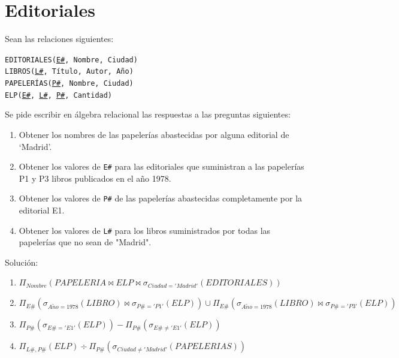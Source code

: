 \documentclass[a4paper]{article}
\begin{document}
\section{Editoriales}

Sean las relaciones siguientes:

\begin{addmargin}[1.5em]{0em}
    \texttt{EDITORIALES(\underline{E\#}, Nombre, Ciudad)}\\
    \texttt{LIBROS(\underline{L\#}, Título, Autor, Año)}\\
    \texttt{PAPELERÍAS(\underline{P\#}, Nombre, Ciudad)}\\
    \texttt{ELP(\underline{E\#}, \underline{L\#}, \underline{P\#}, Cantidad)}
\end{addmargin}


Se pide escribir en álgebra relacional las respuestas a las preguntas siguientes:

\begin{enumerate}
    \item Obtener los nombres de las papelerías abastecidas por alguna editorial de `Madrid'.
    \item Obtener los valores de \texttt{E\#} para las editoriales que suministran a las papelerías P1 y P3 libros publicados en el año 1978.
    \item Obtener los valores de \texttt{P\#} de las papelerías abastecidas completamente por la editorial E1.
    \item Obtener los valores de \texttt{L\#} para los libros suministrados por todas las papelerías que no sean de "Madrid".
\end{enumerate}

\begin{solution}
    Solución:

    \begin{enumerate}
        \item $\Pi_{Nombre} \left( PAPELERIA \bowtie ELP \bowtie \sigma_{Ciudad='Madrid'} \left( EDITORIALES \right) \right)$
        \item $\Pi_{E\#} \left( \sigma_{A\tilde{n}o=1978} \left( LIBRO \right) \bowtie \sigma_{P\#='P1'} \left( ELP \right) \right) \cup \Pi_{E\#} \left( \sigma_{A\tilde{n}o=1978} \left( LIBRO \right) \bowtie \sigma_{P\#='P3'} \left( ELP \right) \right)$
        \item $\Pi_{P\#} \left( \sigma_{E\#='E1'} \left( ELP \right) \right) - \Pi_{P\#} \left( \sigma_{E\# \neq 'E1'} \left( ELP \right) \right)$
        \item $\Pi_{L\#,P\#} \left( ELP \right) \div \Pi_{P\#} \left( \sigma_{Ciudad \neq 'Madrid'} \left( PAPELERIAS \right) \right)$
    \end{enumerate}
\end{solution}
\end{document}
